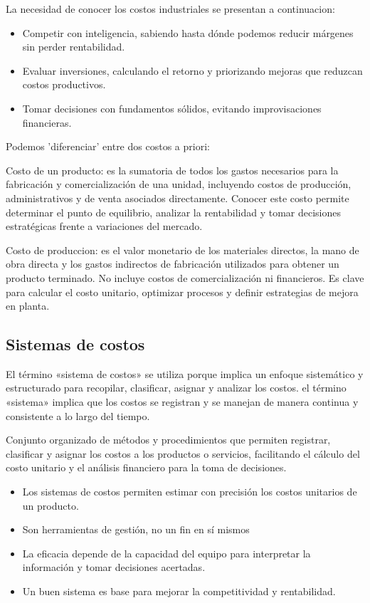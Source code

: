 \documentclass[a4paper,oneside,11pt]{article}
\begin{document}
La  necesidad de conocer los costos industriales se presentan a continuacion:

\begin{itemize}
    \item Competir con inteligencia, sabiendo hasta dónde podemos reducir márgenes sin perder rentabilidad.
    \item Evaluar inversiones, calculando el retorno y priorizando mejoras que reduzcan costos productivos.
    \item Tomar decisiones con fundamentos sólidos, evitando improvisaciones financieras.
\end{itemize}

Podemos 'diferenciar' entre dos costos a priori:

Costo de un producto: es la sumatoria de todos los gastos necesarios para la fabricación y comercialización de una unidad, incluyendo costos de producción, administrativos y de venta asociados directamente. Conocer este costo permite determinar el punto de equilibrio, analizar la rentabilidad y tomar decisiones estratégicas frente a variaciones del mercado.

Costo de produccion: es el valor monetario de los materiales directos, la mano de obra directa y los gastos indirectos de fabricación utilizados para obtener un producto terminado. No incluye costos de comercialización ni financieros. Es clave para calcular el costo unitario, optimizar procesos y definir estrategias de mejora en planta.


\subsection{Sistemas de costos}

El término «sistema de costos» se utiliza porque implica un enfoque sistemático y estructurado para recopilar, clasificar, asignar y analizar los costos. el término «sistema» implica que los costos se registran y se manejan de manera continua y consistente a lo largo del tiempo.

Conjunto organizado de métodos y procedimientos que permiten registrar, clasificar y asignar los costos a los productos o servicios, facilitando el cálculo del costo unitario y el análisis financiero para la toma de decisiones.

\begin{itemize}
    \item Los sistemas de costos permiten estimar con precisión los costos unitarios de un producto.
    \item Son herramientas de gestión, no un fin en sí mismos
    \item La eficacia depende de la capacidad del equipo para interpretar la información y tomar decisiones acertadas.
    \item Un buen sistema es base para mejorar la competitividad y rentabilidad.
\end{itemize}
\end{document}
